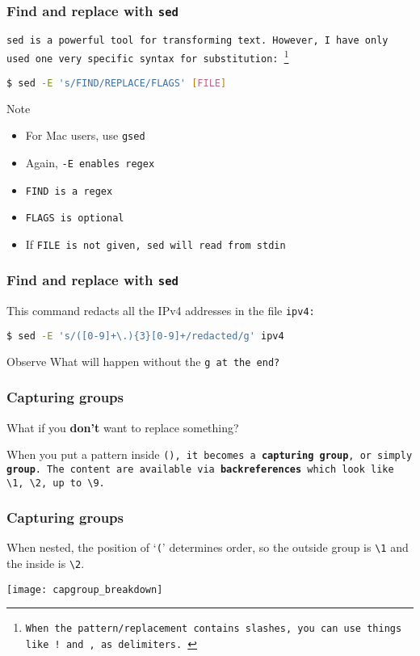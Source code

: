 \begin{frame}[fragile]
\frametitle{Find and replace with \tt{sed}}
\tt{sed} is a powerful tool for transforming text. However, I have only
used one very specific syntax for substitution:
\footnote{
    When the pattern/replacement contains slashes, you can use things like
    \tt{!} and \tt{,} as delimiters.
}
\begin{lstlisting}[language=bash]
$ sed -E 's/FIND/REPLACE/FLAGS' [FILE]
\end{lstlisting}
\begin{block}{Note}
    \begin{itemize}
        \item For Mac users, use \tt{gsed}
        \item Again, \tt{-E} enables regex
        \item \tt{FIND} is a regex
        \item \tt{FLAGS} is optional
        \item If \tt{FILE} is not given, sed will read from stdin
    \end{itemize}
\end{block}
\end{frame}

\begin{frame}[fragile]
\frametitle{Find and replace with \tt{sed}}
This command redacts all the IPv4 addresses in the file \tt{ipv4}:
\begin{lstlisting}[language=bash]
$ sed -E 's/([0-9]+\.){3}[0-9]+/redacted/g' ipv4
\end{lstlisting}
\begin{block}{Observe}
    What will happen without the \tt{g} at the end?
\end{block}
\end{frame}

\begin{frame}[fragile]
\frametitle{Capturing groups}
What if you \textbf{don't} want to replace something?
\bigskip

When you put a pattern inside \tt{()}, it becomes a \textbf{capturing group},
or simply \textbf{group}.
The content are available via \textbf{backreferences} which look like
\verb|\1|, \verb|\2|, up to \verb|\9|.
\end{frame}

\begin{frame}[fragile]
\frametitle{Capturing groups}
When nested, the position of `\verb|(|' determines order, so the outside group
is \verb|\1| and the inside is \verb|\2|.
\bigskip

\texttt{[image: capgroup\_breakdown]}
\end{frame}

